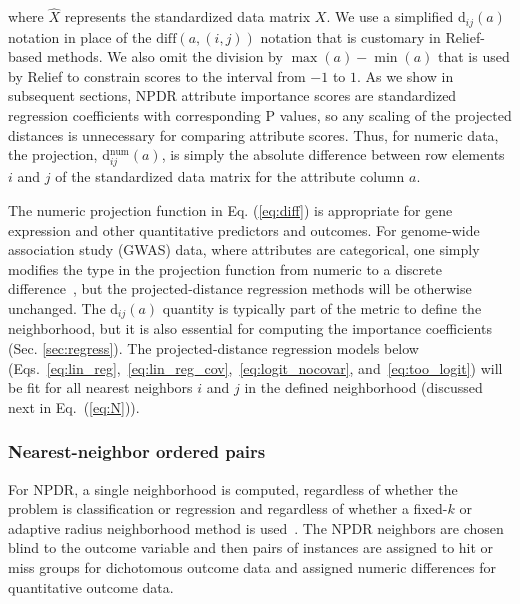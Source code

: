 \documentclass{bioinfo}
\begin{document}
where $\hat{X}$ represents the standardized data matrix $X$.
We use a simplified d$_{ij}(a)$ notation in place of the $\text{diff}(a,(i,j))$ notation that is customary in Relief-based methods.
We also omit the division by $\max(a)-\min(a)$ that is used by Relief to constrain scores to the interval from $-1$ to $1$.
As we show in subsequent sections, NPDR attribute importance scores are standardized regression coefficients with corresponding P values, so any scaling of the projected distances is unnecessary for comparing attribute scores.
Thus, for numeric data, the projection, d$^{\text{num}}_{ij}(a)$, is simply the absolute difference between row elements $i$ and $j$ of the standardized data matrix for the attribute column $a$.

The numeric projection function in Eq. (\ref{eq:diff}) is appropriate for gene expression and other quantitative predictors and outcomes.
For genome-wide association study (GWAS) data, where attributes are categorical, one simply modifies the type in the projection function from numeric to a discrete difference~\citep{titv}, but the projected-distance regression methods will be otherwise unchanged.
The $\text{d}_{ij}(a)$ quantity is typically part of the metric to define the neighborhood, but it is also essential for computing the importance coefficients (Sec. \ref{sec:regress}).
The projected-distance regression models below (Eqs.~\ref{eq:lin_reg},~\ref{eq:lin_reg_cov},~\ref{eq:logit_nocovar}, and~\ref{eq:too_logit}) will be fit for all nearest neighbors $i$ and $j$ in the defined neighborhood (discussed next in Eq.~(\ref{eq:N})).

\subsubsection{Nearest-neighbor ordered pairs}
For NPDR, a single neighborhood is computed, regardless of whether the problem is classification or regression and regardless of whether a fixed-$k$ or adaptive radius neighborhood method is used~\citep{greene09,urbanowicz17,mckinney13}.
The NPDR neighbors are chosen blind to the outcome variable and then pairs of instances are assigned to hit or miss groups for dichotomous outcome data and assigned numeric differences for quantitative outcome data.
\end{document}
